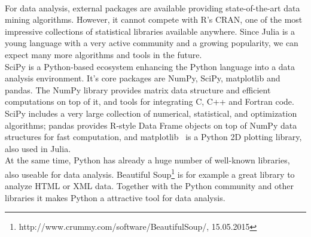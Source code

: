 \\
For data analysis, external packages are available providing state-of-the-art data mining algorithms. However, it cannot compete with R's CRAN, one of the most impressive collections of statistical libraries available anywhere. Since Julia is a young language with a very active community and a growing popularity, we can expect many more algorithms and tools in the future.
\\
SciPy is a Python-based ecosystem enhancing the Python language into a data analysis environment. It's core packages are NumPy, SciPy, matplotlib and pandas. The NumPy library provides matrix data structure and efficient computations on top of it, and tools for integrating C, C++ and Fortran code.
SciPy includes a very large collection of numerical, statistical, and optimization algorithms; pandas provides R-style Data Frame objects on top of NumPy data structures for fast computation, and matplotlib~\parencite{Hunter:2007} is a Python 2D plotting library, also used in Julia. 
\\
At the same time, Python has already a huge number of well-known libraries, also useable for data analysis. Beautiful Soup\footnote{http://www.crummy.com/software/BeautifulSoup/, 15.05.2015} is for example a great library to analyze HTML or XML data. Together with the Python community and other libraries it makes Python a attractive tool for data analysis.


